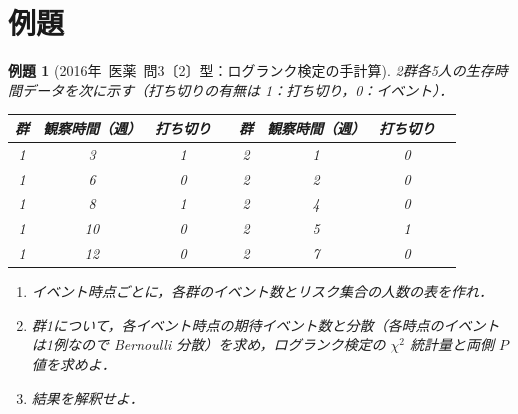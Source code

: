 \documentclass[a4paper,11pt,openany]{ltjsbook}
\newtheorem{reidai}{例題}[chapter]
\newcommand{\kakomon}[2]{\mbox{#1年 医薬 問#2}}
\begin{document}
\section{例題}\label{sec:m02-reidai}
\begin{reidai}[\kakomon{2016}{3}〔2〕型：ログランク検定の手計算]\label{reidai:m02-1}
2群各5人の生存時間データを次に示す（打ち切りの有無は 1：打ち切り，0：イベント）．
\begin{center}\small
\begin{tabular}{@{}cccc@{\qquad}cccc@{}}
\toprule
群 & 観察時間（週） & 打ち切り & & 群 & 観察時間（週） & 打ち切り\\
\midrule
1 & 3 & 1 & & 2 & 1 & 0\\
1 & 6 & 0 & & 2 & 2 & 0\\
1 & 8 & 1 & & 2 & 4 & 0\\
1 & 10 & 0 & & 2 & 5 & 1\\
1 & 12 & 0 & & 2 & 7 & 0\\
\bottomrule
\end{tabular}
\end{center}
\begin{enumerate}[label=〔\arabic*〕]
\item イベント時点ごとに，各群のイベント数とリスク集合の人数の表を作れ．
\item 群1について，各イベント時点の期待イベント数と分散（各時点のイベントは1例なので Bernoulli 分散）を求め，ログランク検定の $\chi^2$ 統計量と両側 $P$ 値を求めよ．
\item 結果を解釈せよ．
\end{enumerate}
\end{reidai}

\end{document}

